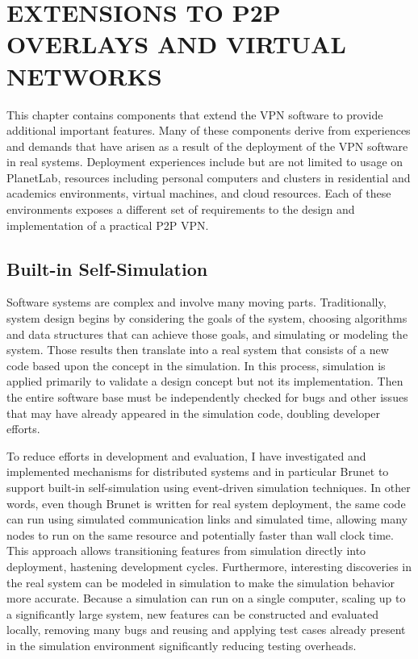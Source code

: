 \chapter{EXTENSIONS TO P2P OVERLAYS AND VIRTUAL NETWORKS}
\label{chap:extensions}

This chapter contains components that extend the VPN software to provide
additional important features.  Many of these components derive from
experiences and demands that have arisen as a result of the deployment of the
VPN software in real systems.  Deployment experiences include but are not
limited to usage on PlanetLab, resources including personal computers and
clusters in residential and academics environments, virtual machines, and cloud
resources.  Each of these environments exposes a different set of requirements
to the design and implementation of a practical P2P VPN.

\section{Built-in Self-Simulation}

Software systems are complex and involve many moving parts.  Traditionally,
system design begins by considering the goals of the system, choosing
algorithms and data structures that can achieve those goals, and simulating or
modeling the system.  Those results then translate into a real system that
consists of a new code based upon the concept in the simulation.  In this
process, simulation is applied primarily to validate a design concept but not
its implementation.  Then the entire software base must be independently
checked for bugs and other issues that may have already appeared in the
simulation code, doubling developer efforts.  

To reduce efforts in development and evaluation, I have investigated and
implemented mechanisms for distributed systems and in particular Brunet to
support built-in self-simulation using event-driven simulation techniques.  In
other words, even though Brunet is written for real system deployment, the same
code can run using simulated communication links and simulated time, allowing
many nodes to run on the same resource and potentially faster than wall clock
time.  This approach allows transitioning features from simulation directly
into deployment, hastening development cycles.  Furthermore, interesting
discoveries in the real system can be modeled in simulation to make the
simulation behavior more accurate.  Because a simulation can run on a single
computer, scaling up to a significantly large system, new features can be
constructed and evaluated locally, removing many bugs and reusing and applying
test cases already present in the simulation environment significantly reducing
testing overheads.

